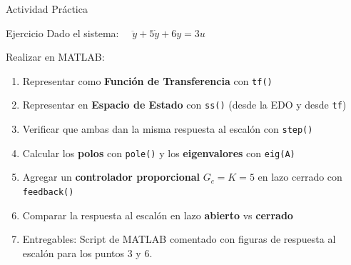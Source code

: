 \documentclass[aspectratio=169,xcolor=dvipsnames]{beamer}
\begin{document}
\begin{frame}{Actividad Pr\'actica}
    \begin{exampleblock}{Ejercicio}
        Dado el sistema: $\quad \ddot{y} + 5\dot{y} + 6y = 3u$
    \end{exampleblock}
    Realizar en MATLAB:
    \begin{enumerate}
        \item Representar como \textbf{Funci\'on de Transferencia} con \texttt{tf()}
        \item Representar en \textbf{Espacio de Estado} con \texttt{ss()} (desde la EDO y desde \texttt{tf})
        \item Verificar que ambas dan la misma respuesta al escal\'on con \texttt{step()}
        \item Calcular los \textbf{polos} con \texttt{pole()} y los \textbf{eigenvalores} con \texttt{eig(A)}
        \item Agregar un \textbf{controlador proporcional} $G_c = K = 5$ en lazo cerrado con \texttt{feedback()}
        \item Comparar la respuesta al escal\'on en lazo \textbf{abierto} vs \textbf{cerrado}
        \item Entregables: Script de MATLAB comentado con figuras de respuesta al escal\'on para los puntos 3 y 6.
    \end{enumerate}

\end{frame}
\end{document}
